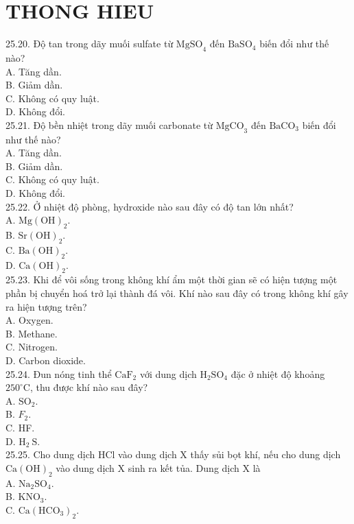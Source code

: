 \documentclass[10pt]{article}
\begin{document}
\section*{THONG HIEU}
25.20. Độ tan trong dãy muối sulfate từ $\mathrm{MgSO}_{4}$ đến $\mathrm{BaSO}_{4}$ biến đổi như thế nào?\\
A. Tăng dần.\\
B. Giảm dần.\\
C. Không có quy luật.\\
D. Không đổi.\\
25.21. Độ bền nhiệt trong dãy muối carbonate từ $\mathrm{MgCO}_{3}$ đến $\mathrm{BaCO}_{3}$ biến đổi như thế nào?\\
A. Tăng dần.\\
B. Giảm dần.\\
C. Không có quy luật.\\
D. Không đổi.\\
25.22. Ở nhiệt độ phòng, hydroxide nào sau đây có độ tan lớn nhất?\\
A. $\mathrm{Mg}(\mathrm{OH})_{2}$.\\
B. $\mathrm{Sr}(\mathrm{OH})_{2}$.\\
C. $\mathrm{Ba}(\mathrm{OH})_{2}$.\\
D. $\mathrm{Ca}(\mathrm{OH})_{2}$.\\
25.23. Khi để vôi sống trong không khí ẩm một thời gian sẽ có hiện tượng một phần bị chuyển hoá trở lại thành đá vôi. Khí nào sau đây có trong không khí gây ra hiện tượng trên?\\
A. Oxygen.\\
B. Methane.\\
C. Nitrogen.\\
D. Carbon dioxide.\\
25.24. Đun nóng tinh thể $\mathrm{CaF}_{2}$ với dung dịch $\mathrm{H}_{2} \mathrm{SO}_{4}$ đặc ở nhiệt độ khoảng $250^{\circ} \mathrm{C}$, thu được khí nào sau đây?\\
A. $\mathrm{SO}_{2}$.\\
B. $F_{2}$.\\
C. HF.\\
D. $\mathrm{H}_{2} \mathrm{~S}$.\\
25.25. Cho dung dịch HCl vào dung dịch X thấy sủi bọt khí, nếu cho dung dịch $\mathrm{Ca}(\mathrm{OH})_{2}$ vào dung dịch X sinh ra kết tủa. Dung dịch X là\\
A. $\mathrm{Na}_{2} \mathrm{SO}_{4}$.\\
B. $\mathrm{KNO}_{3}$.\\
C. $\mathrm{Ca}\left(\mathrm{HCO}_{3}\right)_{2}$.\\
\end{document}
